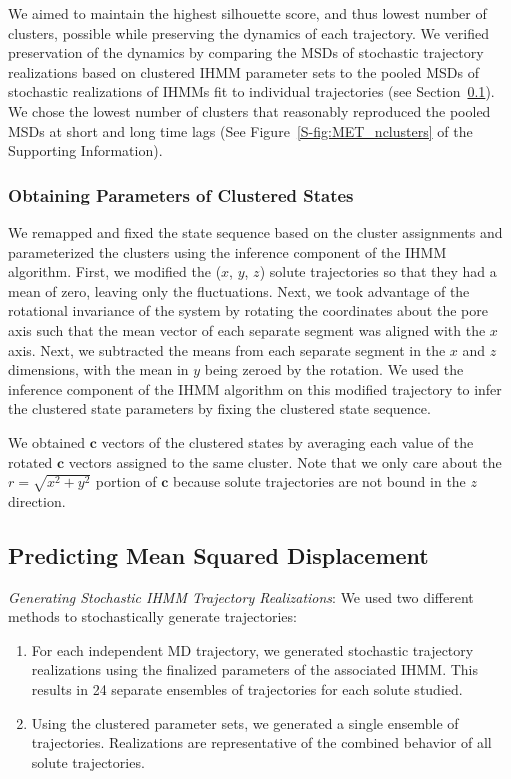 \documentclass[journal=jpcbfk,manuscript=article]{achemso}
\begin{document}
  We aimed to maintain the highest silhouette score, and thus lowest number of clusters,
  possible while preserving the dynamics of each trajectory.
  We verified preservation of the dynamics by comparing the MSDs of stochastic trajectory
  realizations based on clustered IHMM parameter sets to the pooled MSDs of stochastic 
  realizations of IHMMs fit to individual trajectories (see Section~\ref{method:realizations}).
  We chose the lowest number of clusters that reasonably reproduced the pooled MSDs at 
  short and long time lags (See Figure~\ref{S-fig:MET_nclusters} of the Supporting 
  Information).

  \subsubsection*{Obtaining Parameters of Clustered States}
  

  We remapped and fixed the state sequence based on the cluster assignments and 
  parameterized the clusters using the inference component of the IHMM algorithm.
  First, we modified the ($x$, $y$, $z$) solute trajectories so that they had a 
  mean of zero, leaving only the fluctuations. Next, we took advantage of the
  rotational invariance of the system by rotating the coordinates about the pore 
  axis such that the mean vector of each separate segment was aligned with the 
  $x$ axis. Next, we subtracted the means from each separate segment in the $x$ 
  and $z$ dimensions, with the mean in $y$ being zeroed by the rotation. We used
  the inference component of the IHMM algorithm on this modified trajectory to 
  infer the clustered state parameters by fixing the clustered state sequence.
  
  We obtained $\mathbf{c}$ vectors of the clustered states by averaging each 
  value of the rotated $\mathbf{c}$ vectors assigned to the same cluster. Note
  that we only care about the $r=\sqrt{x^2+y^2}$ portion of $\mathbf{c}$ because
  solute trajectories are not bound in the $z$ direction.
  
  \subsection{Predicting Mean Squared Displacement}\label{method:realizations}
  \textit{Generating Stochastic IHMM Trajectory Realizations}: We used two 
  different methods to stochastically generate trajectories:
  \begin{enumerate}[label={Method \theenumi :}, leftmargin=3.5\parindent]
    \item For each independent MD trajectory, we generated stochastic trajectory
    realizations using the finalized parameters of the associated IHMM. This 
    results in 24 separate ensembles of trajectories for each solute studied. 
    \item Using the clustered parameter sets, we generated a single ensemble
	of trajectories. Realizations are representative of the combined behavior
	of all solute trajectories.
  \end{enumerate}
  
\end{document}
